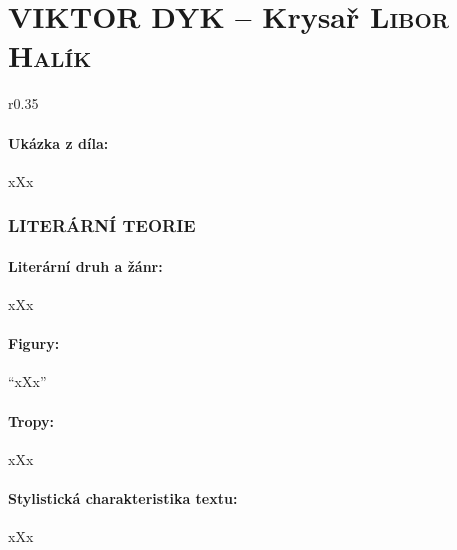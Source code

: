 \documentclass[A4paper]{extarticle} %
\begin{document}
\newpage


\changefontsize{8pt}

\part*{VIKTOR DYK -- Krysař {\hfill \normalfont\tiny\textsc{Libor Halík}}}

\noindent\begin{wrapfigure}{r}{0.35\textwidth}
\tiny

\subsection*{Ukázka z díla:}
\setlength{\parindent}{3pt}
xXx
\end{wrapfigure}

\section*{LITERÁRNÍ TEORIE}

\subsection*{Literární druh a žánr:}
\noindent xXx



\subsection*{Figury:}
\noindent 
\enquote{xXx}

\subsection*{Tropy:}
\noindent 
xXx

\subsection*{Stylistická charakteristika textu:}
\noindent 
xXx
\end{document}
